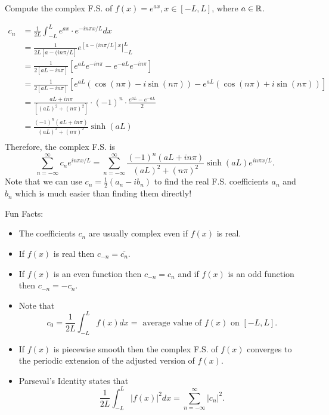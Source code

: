 \documentclass[class=article,crop=false]{standalone}
\begin{document}
\begin{eg}[]
	Compute the complex F.S. of $ f(x)=e^{ax}, x \in [-L,L]$, where $ a \in \mathbb{R}$.

	\begin{align*}
		c_n &= \frac{1}{2L} \int_{-L}^{L} e^{ax} \cdot e^{-i n \pi x /L} dx\\
		    &= \frac{1}{2L[a-(in\pi /L]} e^{[a-(in\pi /L]x} \bigg |_{-L}^L \\
		    &= \frac{1}{2[aL-in\pi]} \left[ e^{aL} e^{-in\pi}-e^{-aL} e^{-in\pi} \right]  \\
		    &= \frac{1}{2[aL-in\pi]} \left[ e^{aL} (\cos(n\pi )-i\sin(n\pi )) -e^{aL}(\cos(n\pi )+i \sin(n\pi )) \right]  \\
		    &= \frac{aL+in\pi}{[(aL)^2+(n\pi)^2] } \cdot (-1)^{n} \cdot \frac{e^{aL}-e^{-aL}}{2 }\\
		    &= \frac{(-1)^{n} (aL+in\pi)}{(aL)^2 + (n\pi)^2 } \sinh(aL)\\
	\end{align*}
	Therefore, the complex F.S. is
	\[
		\sum_{ n= -\infty}^{\infty} c_n e^{in\pi x /L} = \sum_{ n= -\infty}^{\infty}  \frac{(-1)^{n} (aL+in\pi)}{(aL)^2 + (n\pi)^2 } \sinh(aL) e^{in\pi x /L}
	.\] 
	Note that we can use $ c_n= \frac{1}{2} (a_n - ib_n)$ to find the real F.S. coefficients $ a_n$ and $ b_n$ which is much easier than finding them directly!
\end{eg}

Fun Facts:

\begin{itemize}
		\item The coefficients $ c_n$ are usually complex even if $ f(x)$ is real.
		\item If  $ f(x)$ is real then  $ c_{-n} = \overline{c_n}$.
		\item If $ f(x)$ is an even function then  $ c_{-n}=c_n$ and if $ f(x)$ is an odd function then  $ c_{-n}=-c_n$.
		\item Note that
			\[
				c_0 = \frac{1}{2L} \int_{-L}^{L} f(x) dx = \text{ average value of }f(x) \text{ on } [-L,L]
			.\]

		\item If $ f(x)$ is  piecewise smooth then the complex F.S. of $ f(x)$ converges to the periodic extension of the adjusted version of  $ f(x)$.
		\item Parseval's Identity states that
			 \[
				 \frac{1}{2L} \int_{-L}^{L} |f(x)|^2 dx = \sum_{ n= -\infty}^{\infty}  |c_n|^2
			.\] 
\end{itemize}
\end{document}
